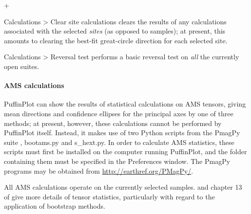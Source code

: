 \documentclass[a4paper,british]{article}
\newcommand{\menuitemlabel}[1]{%
\mbox{\textsf{#1}}\hfil}
\newenvironment{menuitemlist}%
{\begin{list}{}{%
\renewcommand{\makelabel}{\menuitemlabel}%
\setlength{\labelwidth}{35pt}%
\setlength{\leftmargin}%
             {\labelwidth+\labelsep}}}%
{\end{list}}
\newcommand{\ppcmd}[1]{\textsf{#1}} %
\newcommand{\caps}[1]{\MakeTextUppercase{#1}} %
\newcommand{\submenu}{ \textgreater{} } %
\begin{document}
\begin{menuitemlist}
\item[Calculations\submenu Clear site calculations] clears the
results of any calculations associated with the selected {\em sites}
(as opposed to samples); at present, this amounts to clearing the
best-fit great-circle direction for each selected site.

\item[Calculations\submenu Reversal test] performs a basic reversal
test on {\em all} the currently open suites.

\end{menuitemlist}

\paragraph{\caps{Ams} calculations}

PuffinPlot can show the results of statistical calculations on \caps{ams}
tensors, giving mean directions and confidence ellipses for the principal
axes by one of three methods; at present, however, these calculations cannot
be performed by PuffinPlot itself. Instead, it makes use of two Python
scripts from the PmagPy suite \citep{tauxe2010paleomagnetism},
\ppcmd{bootams.py} and \ppcmd{s\_hext.py}. In order to calculate \caps{ams}
statistics, these scripts must first be installed on the computer running
PuffinPlot, and the folder containing them must be specified in the
\ppcmd{Preferences} window. The PmagPy programs may be obtained from
\url{http://earthref.org/PMagPy/}.

All \caps{ams} calculations operate on the currently selected samples.
\cite{tauxe1998directions} and chapter 13 of \cite{tauxe2010paleomagnetism}
give more details of tensor statistics, particularly with regard to the
application of bootstrap methods.
\end{document}
